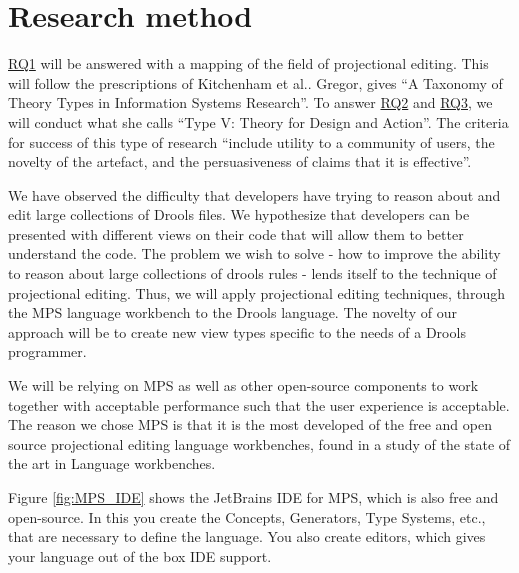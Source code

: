 \section{Research method} 

\hyperref[RQ1]{RQ1} will be answered with a mapping of the field of projectional editing. 
This will follow the prescriptions of Kitchenham et al.\cite{kitchenham2015evidence}.
Gregor\cite{gregor2006nature}, gives “A Taxonomy of Theory Types in Information Systems Research”. 
To answer \hyperref[RQ2]{RQ2} and \hyperref[RQ3]{RQ3}, we will conduct what she calls “Type V: Theory for Design and Action”. 
The criteria for success of this type of research “include utility to a community of users, the novelty of the artefact, and the persuasiveness of claims that it is effective”.

We have observed the difficulty that developers have trying to reason about and edit large collections of Drools files.
We hypothesize that developers can be presented with different views on their code that will allow them to better understand the code.
The problem we wish to solve - how to improve the ability to reason about large collections of drools rules - lends itself to the technique of projectional editing.
Thus, we will apply projectional editing techniques, through the MPS language workbench to the Drools language.
The novelty of our approach will be to create new view types specific to the needs of a Drools programmer.

We will be relying on MPS as well as other open-source components to work together with acceptable performance such that the user experience is acceptable.
The reason we chose MPS is that it is the most developed of the free and open source projectional editing language workbenches, found in a study of the state of the art in Language workbenches\cite{erdweg2013state}.

Figure \ref{fig:MPS_IDE} shows the JetBrains IDE for MPS, which is also free and open-source. 
In this you create the Concepts, Generators, Type Systems, etc., that are necessary to define the language.
You also create editors, which gives your language out of the box IDE support.

